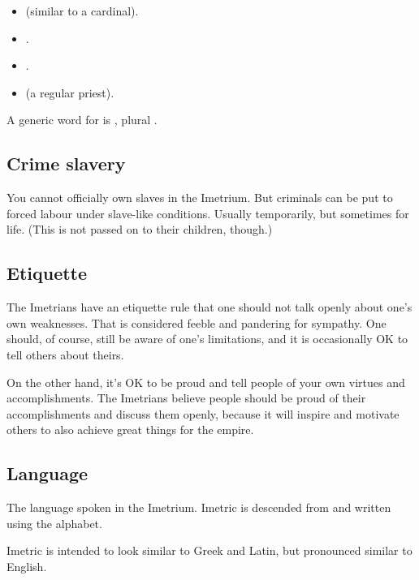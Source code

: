 \begin{itemize}
  \item \Laccorin{} (similar to a cardinal).
  \item \Ispan.
  \item \Telphan. 
  \item \Amra{} (a regular priest).
\end{itemize}

A generic word for  is \Stracos, plural \Stracoi. 




\subsection{Crime slavery}
You cannot officially own slaves in the Imetrium. 
But criminals can be put to forced labour under slave-like conditions. 
Usually temporarily, but sometimes for life. 
(This is not passed on to their children, though.)





\subsection{Etiquette}
The Imetrians have an etiquette rule that one should not talk openly about one's own weaknesses. 
That is considered feeble and pandering for sympathy. 
One should, of course, still be aware of one's limitations, and it is occasionally OK to tell others about theirs. 

On the other hand, it's OK to be proud and tell people of your own virtues and accomplishments. 
The Imetrians believe people should be proud of their accomplishments and discuss them openly, because it will inspire and motivate others to also achieve great things for the empire. 





\subsection{Language}
The language spoken in the Imetrium. 
Imetric is descended from  and written using the \Ortaican{} alphabet. 

Imetric is intended to look similar to Greek and Latin, but pronounced similar to English. 





